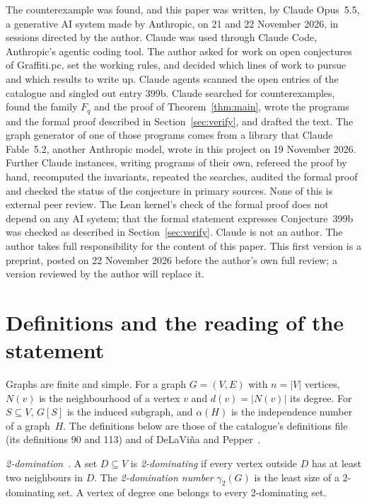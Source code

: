 \documentclass[11pt,a4paper]{article}
\theoremstyle{definition}
\theoremstyle{remark}
\begin{document}
The counterexample was found, and this paper was written, by Claude Opus~5.5, a generative AI
system made by Anthropic, on 21 and 22 November 2026, in sessions directed by the author. Claude
was used through Claude Code, Anthropic's agentic coding tool. The author asked for work on open
conjectures of Graffiti.pc, set the working rules, and decided which lines of work to pursue and
which results to write up. Claude agents scanned the open entries of the catalogue and singled out
entry 399b. Claude searched for counterexamples, found the family $F_q$ and the proof of
Theorem~\ref{thm:main}, wrote the programs and the formal proof described in
Section~\ref{sec:verify}, and drafted the text. The graph generator of one of those programs comes
from a library that Claude Fable~5.2, another Anthropic model, wrote in this project on
19 November 2026. Further Claude instances, writing programs of their
own, refereed the proof by hand, recomputed the invariants, repeated the searches, audited the
formal proof and checked the status of the conjecture in primary sources. None of this is external peer review. The Lean kernel's check of the formal proof does not depend
on any AI system; that the formal statement expresses Conjecture~399b was checked as described in
Section~\ref{sec:verify}. Claude is not an author. The author takes full responsibility for the
content of this paper. This first version is a preprint, posted on 22 November 2026 before the
author's own full review; a version reviewed by the author will replace it.

\section{Definitions and the reading of the statement}\label{sec:defs}

Graphs are finite and simple. For a graph $G=(V,E)$ with $n=|V|$ vertices, $N(v)$ is the
neighbourhood of a vertex $v$ and $d(v)=|N(v)|$ its degree. For $S\subseteq V$, $G[S]$ is the
induced subgraph, and $\alpha(H)$ is the independence number of a graph~$H$. The definitions below
are those of the catalogue's definitions file~\cite{wowii} (its definitions 90 and 113) and of
DeLaVi\~na and Pepper~\cite{dp12}.

\emph{2-domination}~\cite{fj,dlpw}. A set $D\subseteq V$ is \emph{2-dominating} if every vertex
outside $D$ has at least two neighbours in $D$. The \emph{2-domination number} $\gamma_2(G)$ is the
least size of a 2-dominating set. A vertex of degree one belongs to every 2-dominating set.
\end{document}
